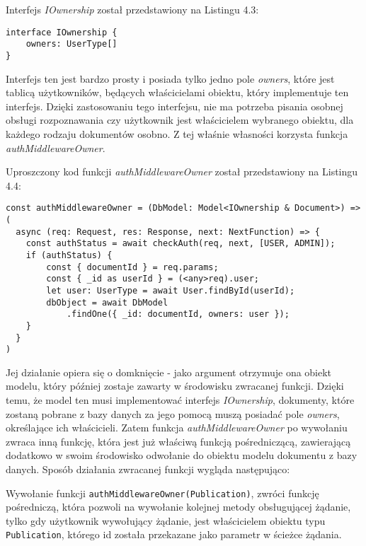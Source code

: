 \documentclass[a4paper,12pt,twoside,openany]{report}
\begin{document}
Interfejs \textit{IOwnership} został przedstawiony na Listingu 4.3:
\begin{lstlisting}[caption=Interfejs IOwnership,label=code1,captionpos=b]
interface IOwnership {
	owners: UserType[]
} 
\end{lstlisting}
Interfejs ten jest bardzo prosty i posiada tylko jedno pole \textit{owners}, które jest tablicą użytkowników, będących właścicielami obiektu, który implementuje ten interfejs. Dzięki zastosowaniu tego interfejsu, nie ma potrzeba pisania osobnej obsługi rozpoznawania czy użytkownik jest właścicielem wybranego obiektu, dla każdego rodzaju dokumentów osobno. Z tej właśnie własności korzysta funkcja \textit{authMiddlewareOwner}.

Uproszczony kod funkcji \textit{authMiddlewareOwner} został przedstawiony na Listingu 4.4:
\begin{lstlisting}[caption=Sygnatura funkcji authMiddlewareOwner,label=code1,captionpos=b]
const authMiddlewareOwner = (DbModel: Model<IOwnership & Document>) => (
  async (req: Request, res: Response, next: NextFunction) => {
	const authStatus = await checkAuth(req, next, [USER, ADMIN]);
	if (authStatus) {	
		const { documentId } = req.params;
		const { _id as userId } = (<any>req).user;
		let user: UserType = await User.findById(userId);
		dbObject = await DbModel
			.findOne({ _id: documentId, owners: user });
	}           
  }
)
\end{lstlisting}

Jej działanie opiera się o domknięcie - jako argument otrzymuje ona obiekt modelu, który później zostaje zawarty w środowisku zwracanej funkcji. Dzięki temu, że model ten musi implementować interfejs \textit{IOwnership}, dokumenty, które zostaną pobrane z bazy danych za jego pomocą muszą posiadać pole \textit{owners}, określające ich właścicieli.
Zatem funkcja  \textit{authMiddlewareOwner} po wywołaniu zwraca inną funkcję, która jest już właściwą funkcją pośredniczącą, zawierającą dodatkowo w swoim środowisko odwołanie do obiektu modelu dokumentu z bazy danych. Sposób działania zwracanej funkcji wygląda następująco:

Wywołanie funkcji \verb|authMiddlewareOwner(Publication)|, zwróci funkcję pośredniczą, która pozwoli na wywołanie kolejnej metody obsługującej żądanie, tylko gdy użytkownik wywołujący żądanie, jest właścicielem obiektu typu \verb|Publication|, którego id została przekazane jako parametr w ścieżce żądania.
\end{document}
